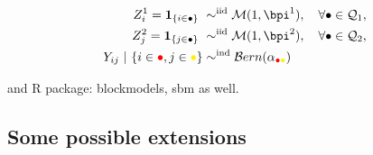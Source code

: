 \documentclass[compress,10pt]{beamer}
\begin{document}
\begin{frame}
\begin{align*}
Z^1_i = \mathbf{1}_{\{i \in \bullet\}}  \ & \sim^{\text{iid}} \mathcal{M}(1,\bpi^1), \quad \forall\bullet \in \mathcal{Q}_1, \\ 
Z^2_j=\mathbf{1}_{\{j \in \bullet\}}  \ & \sim^{\text{iid}} \mathcal{M}(1,\bpi^2), \quad \forall\bullet \in \mathcal{Q}_2, \\
Y_{ij} \ | \ \{i\in\textcolor{red}{\bullet},j\in\textcolor{yellow}{\bullet}\}
& \sim^{\text{ind}} \mathcal{B}ern(\alpha_{\textcolor{red}{\bullet}\textcolor{yellow}{\bullet}})\\
\end{align*}


\textcolor{mygreen}{\cite{Govaert2008}} and 
\textcolor{mygreen}{R package: blockmodels, sbm} as well.

\end{frame}


\subsection{Some possible extensions}
\end{document}
